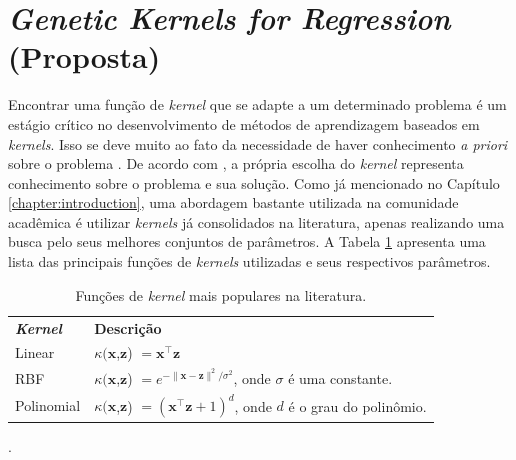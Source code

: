 
\section{\textit{Genetic Kernels for Regression} (Proposta)} \label{sec:gkr}
Encontrar uma função de \textit{kernel} que se adapte a um determinado problema é um estágio crítico no desenvolvimento de métodos de aprendizagem baseados em \textit{kernels}. Isso se deve muito ao fato da necessidade de haver conhecimento \textit{a priori} sobre o problema \cite{shawe2004}. De acordo com , a própria escolha do \textit{kernel} representa conhecimento sobre o problema e sua solução. Como já mencionado no Capítulo \ref{chapter:introduction}, uma abordagem bastante utilizada na comunidade acadêmica é utilizar \textit{kernels} já consolidados na literatura, apenas realizando uma busca pelo seus melhores conjuntos de parâmetros. A Tabela \ref{tab:commom-kernels} apresenta uma lista das principais funções de \textit{kernels} utilizadas e seus respectivos parâmetros.

\begin{table}[H]
    \caption{Funções de \textit{kernel} mais populares na literatura.}
    \begin{center} \label{tab:commom-kernels}
        \begin{tabular}{l@{\hskip 20pt}l}
            \hline\noalign{\smallskip}
            \textbf{\textit{Kernel}} & \textbf{Descrição} \\
            \noalign{\smallskip}
            \hline
            \noalign{\smallskip}
            Linear		& $\kappa({\mathbf x}$,${\mathbf z}$) $= \mathbf{x}^{\top}\mathbf{z}$ \\
            RBF	        & $\kappa({\mathbf x}$,${\mathbf z}$) $= e^{-\|\mathbf{x} - \mathbf{z}\|^2 / \sigma^2}$, onde $\sigma$ é uma constante. \\
            Polinomial	& $\kappa({\mathbf x}$,${\mathbf z}$) $= (\mathbf{x}^{\top}\mathbf{z} + 1)^d$, onde $d$ é o grau do polinômio. \\
            \hline
        \end{tabular}
    \end{center}
    \begin{center}
        .
    \end{center}
\end{table}

